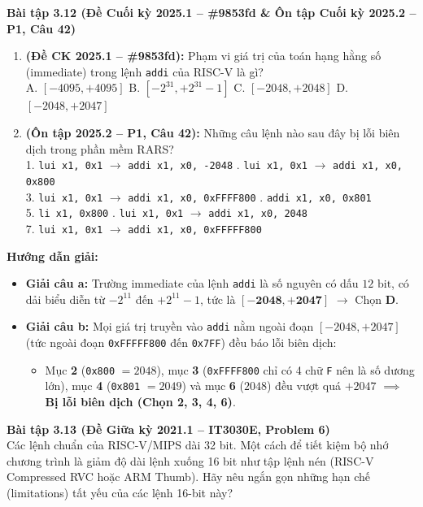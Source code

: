 \textbf{Bài tập 3.12 (Đề Cuối kỳ 2025.1 -- \#9853fd \& Ôn tập Cuối kỳ 2025.2 -- P1, Câu 42)}
\begin{enumerate}[label=\alph*)]
    \item \textbf{(Đề CK 2025.1 -- \#9853fd):} Phạm vi giá trị của toán hạng hằng số (immediate) trong lệnh \texttt{addi} của RISC-V là gì?\\
    A. $[-4095, +4095]$ \quad B. $[-2^{31}, +2^{31}-1]$ \quad C. $[-2048, +2048]$ \quad D. $[-2048, +2047]$
    \item \textbf{(Ôn tập 2025.2 -- P1, Câu 42):} Những câu lệnh nào sau đây bị lỗi biên dịch trong phần mềm RARS?\\
    1. \texttt{lui x1, 0x1} $\rightarrow$ \texttt{addi x1, x0, -2048} . \texttt{lui x1, 0x1} $\rightarrow$ \texttt{addi x1, x0, 0x800}\\
    3. \texttt{lui x1, 0x1} $\rightarrow$ \texttt{addi x1, x0, 0xFFFF800} . \texttt{addi x1, x0, 0x801}\\
    5. \texttt{li x1, 0x800} . \texttt{lui x1, 0x1} $\rightarrow$ \texttt{addi x1, x0, 2048}\\
    7. \texttt{lui x1, 0x1} $\rightarrow$ \texttt{addi x1, x0, 0xFFFFF800}
\end{enumerate}
\textbf{Hướng dẫn giải:}
\begin{itemize}
    \item \textbf{Giải câu a:} Trường immediate của lệnh \texttt{addi} là số nguyên có dấu $12\text{ bit}$, có dải biểu diễn từ $-2^{11}$ đến $+2^{11}-1$, tức là $[\mathbf{-2048, +2047}]$ $\rightarrow$ Chọn \textbf{D}.
    \item \textbf{Giải câu b:} Mọi giá trị truyền vào \texttt{addi} nằm ngoài đoạn $[-2048, +2047]$ (tức ngoài đoạn \texttt{0xFFFFF800} đến \texttt{0x7FF}) đều báo lỗi biên dịch:
    \begin{itemize}
        \item Mục \textbf{2} (\texttt{0x800} $= 2048$), mục \textbf{3} (\texttt{0xFFFF800} chỉ có 4 chữ \texttt{F} nên là số dương lớn), mục \textbf{4} (\texttt{0x801} $= 2049$) và mục \textbf{6} ($2048$) đều vượt quá $+2047$ $\implies$ \textbf{Bị lỗi biên dịch (Chọn 2, 3, 4, 6)}.
    \end{itemize}
\end{itemize}

\textbf{Bài tập 3.13 (Đề Giữa kỳ 2021.1 -- IT3030E, Problem 6)}\\
Các lệnh chuẩn của RISC-V/MIPS dài 32 bit. Một cách để tiết kiệm bộ nhớ chương trình là giảm độ dài lệnh xuống 16 bit như tập lệnh nén (RISC-V Compressed RVC hoặc ARM Thumb). Hãy nêu ngắn gọn những hạn chế (limitations) tất yếu của các lệnh 16-bit này?

